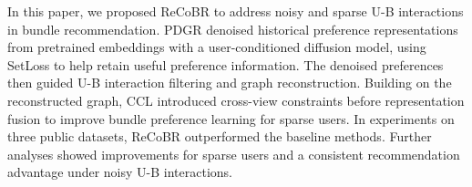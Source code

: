 \documentclass[letterpaper]{article}
\begin{document}
In this paper, we proposed ReCoBR to address noisy and sparse
U-B interactions in bundle recommendation. PDGR denoised historical
preference representations from pretrained embeddings with a
user-conditioned diffusion model, using SetLoss to help retain
useful preference information. The denoised preferences then
guided U-B interaction filtering and graph reconstruction.
Building on the reconstructed graph, CCL introduced cross-view
constraints before representation fusion to improve bundle
preference learning for sparse users. In experiments on three
public datasets, ReCoBR outperformed the baseline methods.
Further analyses showed improvements for sparse users and a
consistent recommendation advantage under noisy U-B interactions.


\end{document}
